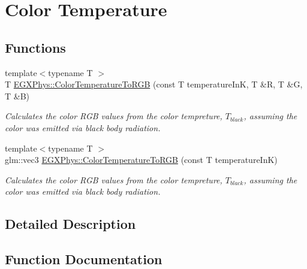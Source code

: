 \hypertarget{group___e_g_x_phys-_astrophysics-_color_temperature}{}\section{Color Temperature}
\label{group___e_g_x_phys-_astrophysics-_color_temperature}
\subsection*{Functions}
\begin{DoxyCompactItemize}
\item 
{\footnotesize template$<$typename T $>$ }\\T \mbox{\hyperlink{group___e_g_x_phys-_astrophysics-_color_temperature_ga81db6b5b397c9f788001be73adae032d}{E\+G\+X\+Phys\+::\+Color\+Temperature\+To\+R\+GB}} (const T temperature\+InK, T \&R, T \&G, T \&B)
\begin{DoxyCompactList}\small\item\em Calculates the color R\+GB values from the color tempreture, $T_{black}$, assuming the color was emitted via black body radiation. \end{DoxyCompactList}\item 
{\footnotesize template$<$typename T $>$ }\\glm\+::vec3 \mbox{\hyperlink{group___e_g_x_phys-_astrophysics-_color_temperature_gaad787485a232976da96c2c785ce21dad}{E\+G\+X\+Phys\+::\+Color\+Temperature\+To\+R\+GB}} (const T temperature\+InK)
\begin{DoxyCompactList}\small\item\em Calculates the color R\+GB values from the color tempreture, $T_{black}$, assuming the color was emitted via black body radiation. \end{DoxyCompactList}\end{DoxyCompactItemize}


\subsection{Detailed Description}


\subsection{Function Documentation}
\mbox{\label{group___e_g_x_phys-_astrophysics-_color_temperature_ga81db6b5b397c9f788001be73adae032d}} 

